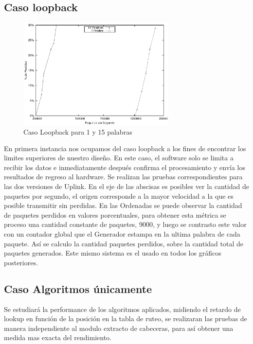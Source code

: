 \subsection{Caso loopback}
\begin{figure}[h]
  \centering
	\includegraphics[width=0.70\textwidth]{5-resultados/graf/loop.eps}
  \caption{Caso Loopback para 1 y 15 palabras}
  \label{fig}
\end{figure}
En primera instancia nos ocupamos del caso loopback a los fines de encontrar los limites superiores de nuestro dise\~no.  En este caso, el software solo se limita a recibir los datos e inmediatamente después confirma el procesamiento y envía los resultados de regreso al hardware. Se realizan las pruebas correspondientes para las dos versiones de Uplink.
En el eje de las abscisas es posibles ver la cantidad de paquetes por segundo, el origen corresponde a la mayor velocidad a la que es posible transmitir sin perdidas. En las Ordenadas se puede observar la cantidad de paquetes perdidos en valores porcentuales, para obtener esta métrica se proceso una cantidad constante de paquetes, 9000, y luego se contrasto este valor con un contador global que el Generador estampa en la ultima palabra de cada paquete. Así se calculo la cantidad paquetes perdidos, sobre la cantidad total de paquetes generados. Este mismo sistema es el usado en todos los gráficos posteriores.

\subsection{Caso Algoritmos únicamente}

Se estudiará la performance de los algoritmos aplicados, midiendo el retardo de lookup en función de la posición en la tabla de ruteo, se realizaran las pruebas de manera independiente al modulo extracto de cabeceras, para así obtener una medida mas exacta del rendimiento.

